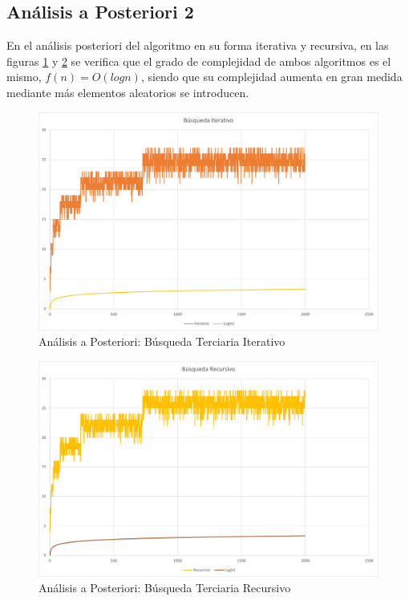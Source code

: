     
    \newpage    
    \subsection{Análisis a Posteriori 2}
        En el análisis posteriori del algoritmo en su forma iterativa y recursiva, en las figuras \ref{fig:posteriori2} y \ref{fig:posteriori3} se verifica que el grado de complejidad de ambos algoritmos es el mismo, \(f(n) = O(logn)\), siendo que su complejidad aumenta en gran medida mediante más elementos aleatorios se introducen.
        \begin{figure}[htp!]
            \centering
            \includegraphics[width=0.8 \textwidth]{Images/A_Posteriori/posteriori2.png}  
            \caption{Análisis a Posteriori: Búsqueda Terciaria Iterativo}
            \label{fig:posteriori2}
        \end{figure}
        
        \begin{figure}[htp!]
            \centering
            \includegraphics[width=0.8 \textwidth]{Images/A_Posteriori/posteriori3.png}  
            \caption{Análisis a Posteriori: Búsqueda Terciaria Recursivo}
            \label{fig:posteriori3}
        \end{figure}
    \newpage    
